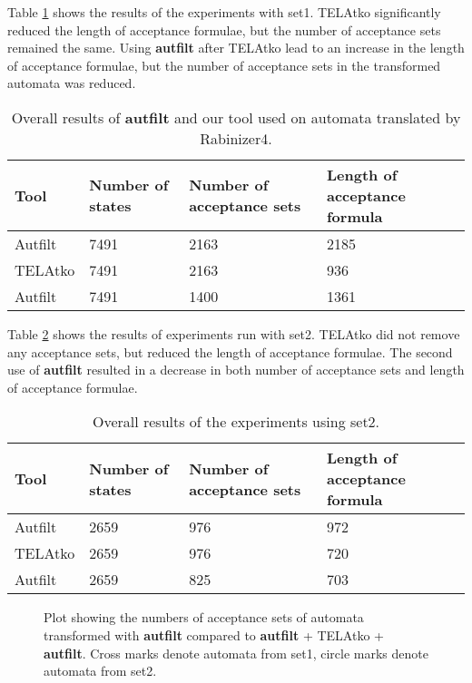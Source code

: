 \documentclass[
  digital, %
  twoside, %
  table,   %
  lof,     %
  lot,     %
]{fithesis3}
\begin{document}
Table \ref{tab:rabinizer4} shows the results of the experiments with set1. TELAtko significantly reduced the length of acceptance formulae, but the number of acceptance sets remained the same. Using \textbf{autfilt} after TELAtko lead to an increase in the length of acceptance formulae, but the number of acceptance sets in the transformed automata was reduced.

\begin{table}[h]
  \begin{tabularx}{\textwidth}{lXXX}
    \toprule
    Tool & Number of states & Number of acceptance sets & Length of acceptance formula  \\
    \midrule
    Autfilt & 7491 & 2163 & 2185 \\
    TELAtko & 7491 & 2163 & 936 \\
    Autfilt & 7491 & 1400 & 1361 \\    
    \bottomrule
  \end{tabularx}
  \caption{Overall results of \textbf{autfilt} and our tool used on automata translated by Rabinizer4.}
  \label{tab:rabinizer4}
\end{table}

Table \ref{tab:ltl3tela} shows the results of experiments run with set2. TELAtko did not remove any acceptance sets, but reduced the length of acceptance formulae. The second use of \textbf{autfilt} resulted in a decrease in both number of acceptance sets and length of acceptance formulae.

\begin{table}[h]
  \begin{tabularx}{\textwidth}{lXXX}
    \toprule
    Tool & Number of states & Number of acceptance sets & Length of acceptance formula  \\
    \midrule
    Autfilt & 2659 & 976 & 972 \\
    TELAtko & 2659 & 976 & 720 \\
    Autfilt & 2659 & 825 & 703 \\    
    \bottomrule
  \end{tabularx}
  \caption{Overall results of the experiments using set2.}
  \label{tab:ltl3tela}
\end{table}

\begin{figure}[h]
  \centering
    \begin{tikzpicture}
      
    \end{tikzpicture}
  \caption{Plot showing the numbers of acceptance sets of automata transformed with \textbf{autfilt} compared to \textbf{autfilt} + TELAtko + \textbf{autfilt}. Cross marks denote automata from set1, circle marks denote automata from set2.}
  \label{fig:scplot_marks}
\end{figure}
\end{document}
